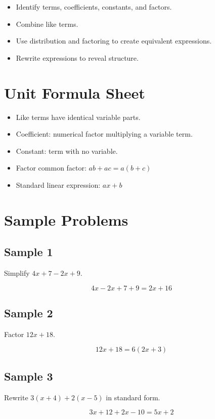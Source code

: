 \documentclass[11pt]{book}
\begin{document}
\begin{itemize}
\item Identify terms, coefficients, constants, and factors.
\item Combine like terms.
\item Use distribution and factoring to create equivalent expressions.
\item Rewrite expressions to reveal structure.
\end{itemize}

\section{Unit Formula Sheet}

\begin{itemize}
\item Like terms have identical variable parts.
\item Coefficient: numerical factor multiplying a variable term.
\item Constant: term with no variable.
\item Factor common factor: \(ab+ac=a(b+c)\)
\item Standard linear expression: \(ax+b\)
\end{itemize}

\section{Sample Problems}

\subsection{Sample 1}

Simplify \(4x+7-2x+9\).

\[4x-2x+7+9=2x+16\]

\subsection{Sample 2}

Factor \(12x+18\).

\[12x+18=6(2x+3)\]

\subsection{Sample 3}

Rewrite \(3(x+4)+2(x-5)\) in standard form.

\[3x+12+2x-10=5x+2\]
\end{document}
